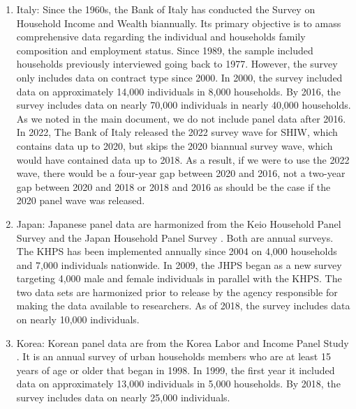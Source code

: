 \begin{enumerate}
    \item Italy: Since the 1960s, the Bank of Italy has conducted the Survey on Household Income and Wealth  \citep{shiw_historical_2019} biannually. Its primary objective is to amass comprehensive data regarding the individual and households family composition and employment status.   Since 1989, the sample included households previously interviewed going back to 1977.  However, the survey only includes data on contract type since 2000.  In 2000, the survey included data on approximately 14,000 individuals in 8,000 households.  By 2016, the survey includes data on nearly 70,000 individuals in nearly 40,000 households.  As we noted in the main document, we do not include panel data after 2016.  In 2022, The Bank of Italy released the 2022 survey wave for SHIW, which contains data up to 2020, but skips the 2020 biannual survey wave, which would have contained data up to 2018.  As a result, if we were to use the 2022 wave, there would be a four-year gap between 2020 and 2016, not a two-year gap between 2020 and 2018 or 2018 and 2016 as should be the case if the 2020 panel wave was released.

    \item Japan: Japanese panel data are harmonized from the Keio Household Panel Survey and the Japan Household Panel Survey \citep{jhpskhps_keio_2019}.  Both are annual surveys.  The KHPS has been implemented annually since 2004 on 4,000 households and 7,000 individuals nationwide.  In 2009, the JHPS began as a new survey targeting 4,000 male and female individuals in parallel with the KHPS.  The two data sets are harmonized prior to release by the agency responsible for making the data available to researchers.  As of 2018, the survey includes data on nearly 10,000 individuals.  

    \item Korea: Korean panel data are from the Korea Labor and Income Panel Study \citep{klips_korean_2020}.  It is an annual survey of urban households members who are at least 15 years of age or older that began in 1998.  In 1999, the first year it included data on approximately 13,000 individuals in 5,000 households.  By 2018, the survey includes data on nearly 25,000 individuals.


\end{enumerate}
